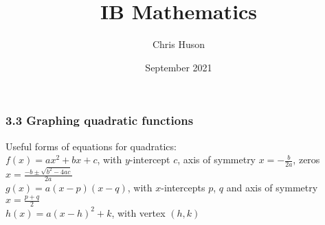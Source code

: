 \documentclass[12pt, twoside]{article}
\title{IB Mathematics}
\author{Chris Huson}
\date{September 2021}
\begin{document}
\subsubsection*{3.3 Graphing quadratic functions}
Useful forms of equations for quadratics:\\[0.25cm] 
$f(x)=ax^2 + bx+c$, with $y$-intercept $c$, axis of symmetry $\displaystyle x=-\frac{b}{2a}$, zeros $\displaystyle x=\frac{-b \pm \sqrt{b^2-4ac}}{2a}$\\[0.25cm]
$g(x)=a(x-p)(x-q)$, with $x$-intercepts $p$, $q$ and axis of symmetry $\displaystyle x=\frac{p+q}{2}$\\[0.25cm] 
$h(x)=a(x-h)^2+k$, with vertex $(h,k)$
\vspace{0.5cm}
\end{document}
